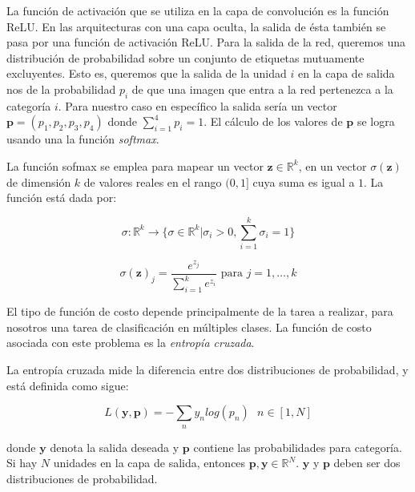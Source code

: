 La función de activación que se utiliza en la capa de
convolución es la función ReLU. En las arquitecturas con
una capa oculta, la salida de ésta también se pasa 
por una función de activación ReLU. Para la salida 
de la red, queremos una distribución de probabilidad
sobre un conjunto de etiquetas mutuamente excluyentes.
Esto es, queremos que la salida de la unidad $i$ en la capa
de salida nos de la probabilidad $p_i$ de que una imagen que
entra
a la red pertenezca a la categoría $i$. Para nuestro caso en específico
la salida sería un vector $\mathbf{p} = (p_1, p_2, p_3, p_4)$ donde $\sum_{i = 1}^4 p_i = 1$.
El cálculo de los valores de $\mathbf{p}$  se logra usando una la función \textit{softmax}.\\

\begin{remark}

La función sofmax se emplea para mapear un vector $\mathbf{z} \in \mathbb{R}^k$,  en un vector $\sigma(\mathbf{z})$ de dimensión $k$ de valores reales en el rango $(0, 1]$ cuya suma es igual a $1$. La función está dada por: 
\end{remark}

\[
\sigma : \mathbb{R}^k \rightarrow \bigg \{ \sigma \in \mathbb{R}^k | \sigma_i > 0, \sum_{i=1}^k \sigma_i = 1 \bigg \}
\]

\[
\sigma(\mathbf{z})_j = \frac{e^{z_j}}{\sum_{i=1}^k e^{z_i}} \text{ para  } j=1,\dots,k
\]
%

El tipo de función de costo depende principalmente de la tarea a realizar,
para nosotros una tarea de clasificación en múltiples clases. La función
de costo asociada con este problema es la \textit{entropía cruzada}.\\

\begin{remark}
La entropía cruzada mide la diferencia entre dos distribuciones de probabilidad, y está
definida como sigue:

\[
L(\mathbf{y}, \mathbf{p}) = - \sum_{n} y_n log(p_n) \text{		} n \in [1,N]
\]

donde $\mathbf{y}$ denota la salida deseada y $\mathbf{p}$ contiene las probabilidades
para categoría. Si hay $N$ unidades en la capa de salida, entonces
$\mathbf{p}, \mathbf{y} \in \mathbb{R}^N$. $\mathbf{y}$ y $\mathbf{p}$ deben ser dos distribuciones de probabilidad.
\end{remark}


